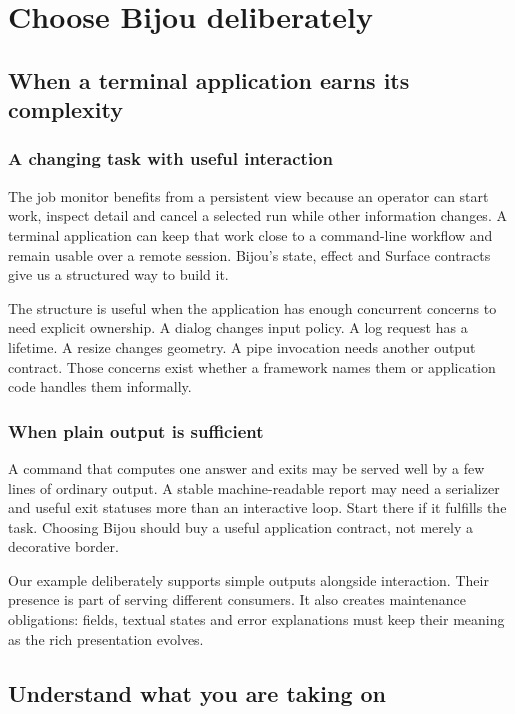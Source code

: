 \chapter{Choose Bijou deliberately}\label{teaching-fit}

\section{When a terminal application earns its complexity}
\subsection{A changing task with useful interaction}

The job monitor benefits from a persistent view because an operator can start work, inspect detail and cancel a selected run while other information changes. A terminal application can keep that work close to a command-line workflow and remain usable over a remote session. Bijou's state, effect and Surface contracts give us a structured way to build it.

The structure is useful when the application has enough concurrent concerns to need explicit ownership. A dialog changes input policy. A log request has a lifetime. A resize changes geometry. A pipe invocation needs another output contract. Those concerns exist whether a framework names them or application code handles them informally.

\subsection{When plain output is sufficient}

A command that computes one answer and exits may be served well by a few lines of ordinary output. A stable machine-readable report may need a serializer and useful exit statuses more than an interactive loop. Start there if it fulfills the task. Choosing Bijou should buy a useful application contract, not merely a decorative border.

Our example deliberately supports simple outputs alongside interaction. Their presence is part of serving different consumers. It also creates maintenance obligations: fields, textual states and error explanations must keep their meaning as the rich presentation evolves.

\section{Understand what you are taking on}
